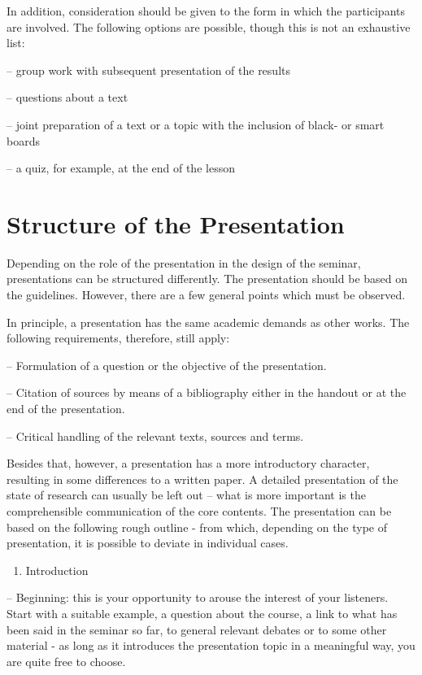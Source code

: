 \documentclass[
  english,
]{scrreprt}
\providecommand{\tightlist}{%
  \setlength{\itemsep}{0pt}\setlength{\parskip}{0pt}}
\begin{document}
In addition, consideration should be given to the form in which the participants are involved. The following options are possible, though this is not an exhaustive list:

– group work with subsequent presentation of the results

– questions about a text

– joint preparation of a text or a topic with the inclusion of black- or smart boards

– a quiz, for example, at the end of the lesson

\section{Structure of the Presentation}\label{sec:presentation_structure}

Depending on the role of the presentation in the design of the seminar, presentations can be structured differently. The presentation should be based on the guidelines. However, there are a few general points which must be observed.

In principle, a presentation has the same academic demands as other works. The following requirements, therefore, still apply:

– Formulation of a question or the objective of the presentation.

– Citation of sources by means of a bibliography either in the handout or at the end of the presentation.

– Critical handling of the relevant texts, sources and terms.

Besides that, however, a presentation has a more introductory character, resulting in some differences to a written paper. A detailed presentation of the state of research can usually be left out – what is more important is the comprehensible communication of the core contents. The presentation can be based on the following rough outline - from which, depending on the type of presentation, it is possible to deviate in individual cases.

\begin{enumerate}
\def\labelenumi{\arabic{enumi}.}
\tightlist
\item
  Introduction
\end{enumerate}

– Beginning: this is your opportunity to arouse the interest of your listeners. Start with a suitable example, a question about the course, a link to what has been said in the seminar so far, to general relevant debates or to some other material - as long as it introduces the presentation topic in a meaningful way, you are quite free to choose.
\end{document}
